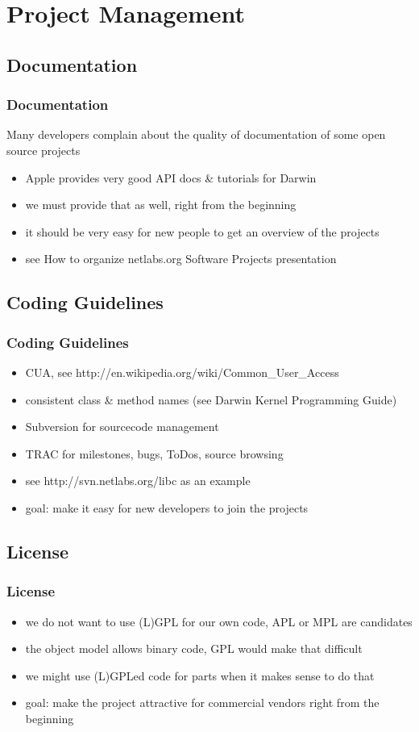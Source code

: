 \documentclass[handout]{beamer}
\begin{document}
\section{Project Management}
\subsection{Documentation}
\begin{frame}
\frametitle{Documentation}
	Many developers complain about the quality of documentation of some open source projects
	\begin{itemize}
		\item Apple provides very good API docs \& tutorials for Darwin
		\item we must provide that as well, right from the beginning
		\item it should be very easy for new people to get an overview of the projects
		\item see How to organize netlabs.org Software Projects presentation
	\end{itemize}
\end{frame}

\subsection{Coding Guidelines}
\begin{frame}
\frametitle{Coding Guidelines}
	\begin{itemize}
		\item CUA, see http://en.wikipedia.org/wiki/Common\_User\_Access
		\item consistent class \& method names (see Darwin Kernel Programming Guide)
		\item Subversion for sourcecode management
		\item TRAC for milestones, bugs, ToDos, source browsing
		\item see http://svn.netlabs.org/libc as an example
		\item goal: make it easy for new developers to join the projects
	\end{itemize}
\end{frame}

\subsection{License}
\begin{frame}
\frametitle{License}
	\begin{itemize}
		\item we do not want to use (L)GPL for our own code, APL or MPL are candidates
		\item the object model allows binary code, GPL would make that difficult
		\item we might use (L)GPLed code for parts when it makes sense to do that
		\item goal: make the project attractive for commercial vendors right from the beginning
	\end{itemize}
\end{frame}
\end{document}
